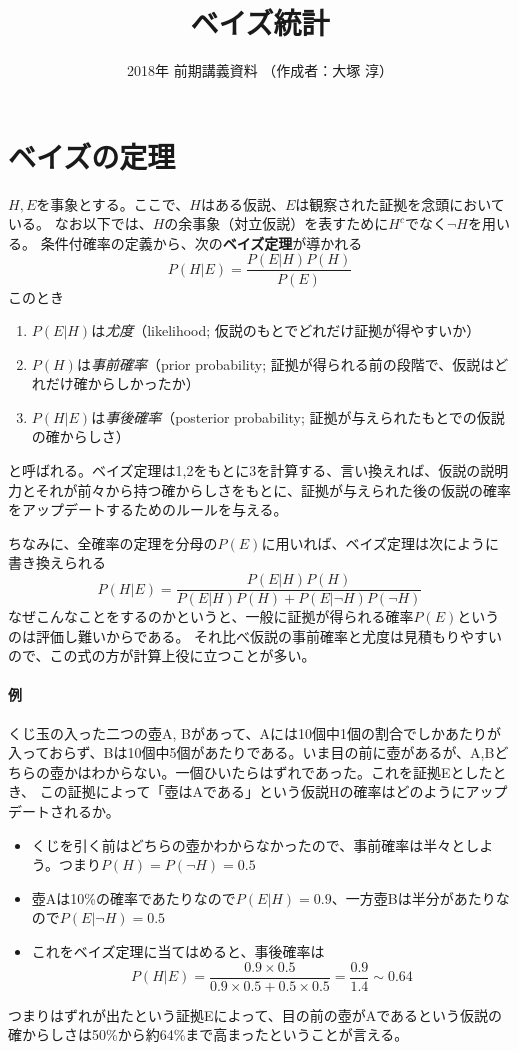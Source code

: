 \documentclass{jsarticle}
\title{ベイズ統計}
\author{2018年 前期講義資料 （作成者：大塚 淳）}
\date{ }                                           %
\begin{document}
\maketitle



\section{ベイズの定理}

$H, E$を事象とする。ここで、$H$はある仮説、$E$は観察された証拠を念頭においている。
なお以下では、$H$の余事象（対立仮説）を表すために$H^c$でなく$\neg H$を用いる。
条件付確率の定義から、次の\textbf{ベイズ定理}が導かれる
$$ P(H|E) = \frac{P(E|H)P(H)}{P(E)}$$
このとき
\begin{enumerate}
\item $P(E|H)$は\emph{尤度}（likelihood; 仮説のもとでどれだけ証拠が得やすいか）
\item $P(H)$は\emph{事前確率}（prior probability; 証拠が得られる前の段階で、仮説はどれだけ確からしかったか）
\item $P(H|E)$は\emph{事後確率}（posterior probability; 証拠が与えられたもとでの仮説の確からしさ）
\end{enumerate}
と呼ばれる。ベイズ定理は1,2をもとに3を計算する、言い換えれば、仮説の説明力とそれが前々から持つ確からしさをもとに、証拠が与えられた後の仮説の確率をアップデートするためのルールを与える。



ちなみに、全確率の定理を分母の$P(E)$に用いれば、ベイズ定理は次にように書き換えられる
$$ P(H|E) = \frac{P(E|H)P(H)}{P(E|H)P(H) + P(E|\lnot H)P(\lnot H)}$$
なぜこんなことをするのかというと、一般に証拠が得られる確率$P(E)$というのは評価し難いからである。
それ比べ仮説の事前確率と尤度は見積もりやすいので、この式の方が計算上役に立つことが多い。




\paragraph{例}
くじ玉の入った二つの壺A, Bがあって、Aには10個中1個の割合でしかあたりが入っておらず、Bは10個中5個があたりである。いま目の前に壺があるが、A,Bどちらの壺かはわからない。一個ひいたらはずれであった。これを証拠Eとしたとき、 この証拠によって「壺はAである」という仮説Hの確率はどのようにアップデートされるか。
\begin{itemize}
\item くじを引く前はどちらの壺かわからなかったので、事前確率は半々としよう。つまり$P(H) = P(\lnot H) = 0.5$
\item 壺Aは10\%の確率であたりなので$P(E|H) = 0.9$、一方壺Bは半分があたりなので$P(E|\lnot H) = 0.5$
\item これをベイズ定理に当てはめると、事後確率は$$P(H|E) = \frac{0.9 \times 0.5 }{0.9 \times 0.5 + 0.5 \times 0.5} = \frac{0.9}{1.4} \sim 0.64 $$
\end{itemize}
つまりはずれが出たという証拠Eによって、目の前の壺がAであるという仮説の確からしさは50\%から約64\%まで高まったということが言える。
\end{document}

